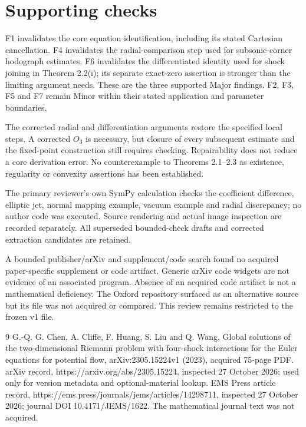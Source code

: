 \documentclass[10pt]{article}
\begin{document}
\section*{Supporting checks}
F1 invalidates the core equation identification, including its stated Cartesian cancellation. F4 invalidates the radial-comparison step used for subsonic-corner hodograph estimates. F6 invalidates the differentiated identity used for shock joining in Theorem 2.2(i); its separate exact-zero assertion is stronger than the limiting argument needs. These are the three supported Major findings. F2, F3, F5 and F7 remain Minor within their stated application and parameter boundaries.\par
The corrected radial and differentiation arguments restore the specified local steps. A corrected \(O_3\) is necessary, but closure of every subsequent estimate and the fixed-point construction still requires checking. Repairability does not reduce a core derivation error. No counterexample to Theorems 2.1–2.3 as existence, regularity or convexity assertions has been established.\par
The primary reviewer’s own SymPy calculation checks the coefficient difference, elliptic jet, normal mapping example, vacuum example and radial discrepancy; no author code was executed. Source rendering and actual image inspection are recorded separately. All superseded bounded-check drafts and corrected extraction candidates are retained.\par
A bounded publisher/arXiv and supplement/code search found no acquired paper-specific supplement or code artifact. Generic arXiv code widgets are not evidence of an associated program. Absence of an acquired code artifact is not a mathematical deficiency. The Oxford repository surfaced as an alternative source but its file was not acquired or compared. This review remains restricted to the frozen v1 file.\par
9 G.-Q. G. Chen, A. Cliffe, F. Huang, S. Liu and Q. Wang, Global solutions of the two-dimensional Riemann problem with four-shock interactions for the Euler equations for potential flow, arXiv:2305.15224v1 (2023), acquired 75-page PDF. arXiv record, https://arxiv.org/abs/2305.15224, inspected 27 October 2026; used only for version metadata and optional-material lookup. EMS Press article record, https://ems.press/journals/jems/articles/14298711, inspected 27 October 2026; journal DOI 10.4171/JEMS/1622. The mathematical journal text was not acquired.\par
\end{document}
